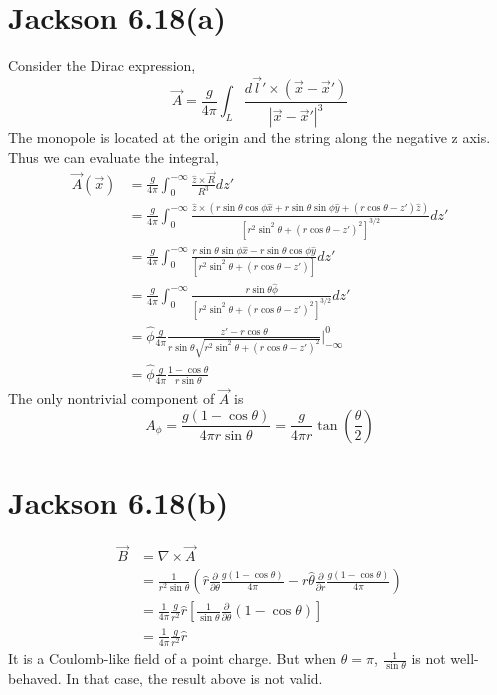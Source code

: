 \documentclass{article}
\newcommand{\pd}[2]{\frac{\partial#1}{\partial#2}}
\begin{document}
\section*{Jackson 6.18(a)}

Consider the Dirac expression,
\[ \vec A=\frac{g}{4\pi}\int_L\frac{d\vec l'\times(\vec x-\vec x')}{|\vec x-\vec x'|^3} \]
The monopole is located at the origin and the string along the negative z axis. Thus we can evaluate the integral,
\begin{align*}
  \vec A(\vec x)&=\frac{g}{4\pi}\int_0^{-\infty}\frac{\hat z\times\vec R}{R^3}dz'\\
                &=\frac{g}{4\pi}\int_0^{-\infty}\frac{\hat z\times(r\sin\theta\cos\phi\hat x+r\sin\theta\sin\phi\hat y+(r\cos\theta-z')\hat z)}{[r^2\sin^2\theta+(r\cos\theta-z')^2]^{3/2}}dz'\\
                &=\frac{g}{4\pi}\int_0^{-\infty}\frac{r\sin\theta\sin\phi\hat x-r\sin\theta\cos\phi\hat y}{[r^2\sin^2\theta+(r\cos\theta-z')]}dz'\\
                &=\frac{g}{4\pi}\int_0^{-\infty}\frac{r\sin\theta\hat\phi}{[r^2\sin^2\theta+(r\cos\theta-z')^2]^{3/2}}dz'\\
                &=\hat\phi\frac{g}{4\pi}\frac{z'-r\cos\theta}{r\sin\theta\sqrt{r^2\sin^2\theta+(r\cos\theta-z')^2}}|_{-\infty}^{0} \\
                &=\hat\phi\frac{g}{4\pi}\frac{1-\cos\theta}{r\sin\theta}
\end{align*}
The only nontrivial component of $\vec A$ is
\[ \boxed{A_\phi=\frac{g(1-\cos\theta)}{4\pi r\sin\theta}=\frac{g}{4\pi r}\tan(\frac{\theta}{2})} \]

\section*{Jackson 6.18(b)}

\begin{align*}
  \vec B&=\nabla\times\vec A\\
         &=\frac{1}{r^2\sin\theta}(\hat r\pd{}{\theta}\frac{g(1-\cos\theta)}{4\pi}-r\hat\theta\pd{}{r}\frac{g(1-\cos\theta)}{4\pi})\\
         &=\frac{1}{4\pi}\frac{g}{r^2}\hat r[\frac{1}{\sin\theta}\pd{}{\theta}(1-\cos\theta)]\\
         &=\frac{1}{4\pi}\frac{g}{r^2}\hat r
\end{align*}
It is a Coulomb-like field of a point charge. But when $\theta=\pi$,
$\frac{1}{\sin\theta}$
is not well-behaved. In that case, the result above is not valid.
\end{document}
